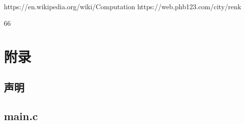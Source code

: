 \documentclass[UTF8]{ctexart}
\begin{document}
\subsection{} 
\begin{thebibliography}{}
    https://en.wikipedia.org/wiki/Computation
    https://web.phb123.com/city/renk 
\end{thebibliography}{66}
\newpage
\section{附录}
\subsection{声明}
\subsection{main.c}
\end{document}
